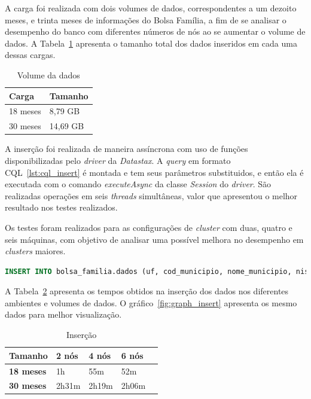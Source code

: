 A carga foi realizada com dois volumes de dados, correspondentes a um dezoito meses, e trinta meses de informações do Bolsa Família, a fim de se analisar o desempenho do banco com diferentes números de nós ao se aumentar o volume de dados. A Tabela~\ref{tab:volume} apresenta o tamanho total dos dados inseridos em cada uma dessas cargas.

\begin{table}[]
	\centering
	\caption{Volume da dados}
	\label{tab:volume}
	\begin{tabular}{ll}
		\textbf{Carga} & \textbf{Tamanho} \\ \hline
		18 meses     &  8,79 GB              \\ \hline
		30 meses    &  14,69 GB             \\ \hline
	\end{tabular}
\end{table}

A inserção foi realizada de maneira assíncrona com uso de funções disponibilizadas pelo \emph{driver} da \emph{Datastax}. A \emph{query} em formato CQL~\ref{lst:cql_insert} é montada e tem seus parâmetros substituidos, e então ela é executada com o comando \emph{executeAsync} da classe \emph{Session} do \emph{driver}. São realizadas operações em seis \emph{threads} simultâneas, valor que apresentou o melhor resultado nos testes realizados.

Os testes foram realizados para as configurações de \emph{cluster} com duas, quatro e seis máquinas, com objetivo de analisar uma possível melhora no desempenho em \emph{clusters} maiores.

\begin{lstlisting}[caption={Código CQL para inserção},label={lst:cql_insert},language=SQL]
INSERT INTO bolsa_familia.dados (uf, cod_municipio, nome_municipio, nis_favorecido, nome_favorecido, fonte, valor, periodo) VALUES (?, ?, ?, ?, ?, ?, ?, ?)
\end{lstlisting}

A Tabela~\ref{tb_insert} apresenta os tempos obtidos na inserção dos dados nos diferentes ambientes e volumes de dados. O gráfico~\ref{fig:graph_insert} apresenta os mesmo dados para melhor visualização.


\begin{table}[]
	\centering
	\caption{Inserção}
	\label{tb_insert}
	\begin{tabular}{lllll}
		\textbf{Tamanho}	& \textbf{2 nós} & \textbf{4 nós} & \textbf{6 nós} \\ \hline
		\textbf{18 meses}   	& 1h         	 & 55m       	  & 52m            \\ \hline
		\textbf{30 meses}     & 2h31m      	 & 2h19m          & 2h06m          \\ \hline
	\end{tabular}
\end{table}

